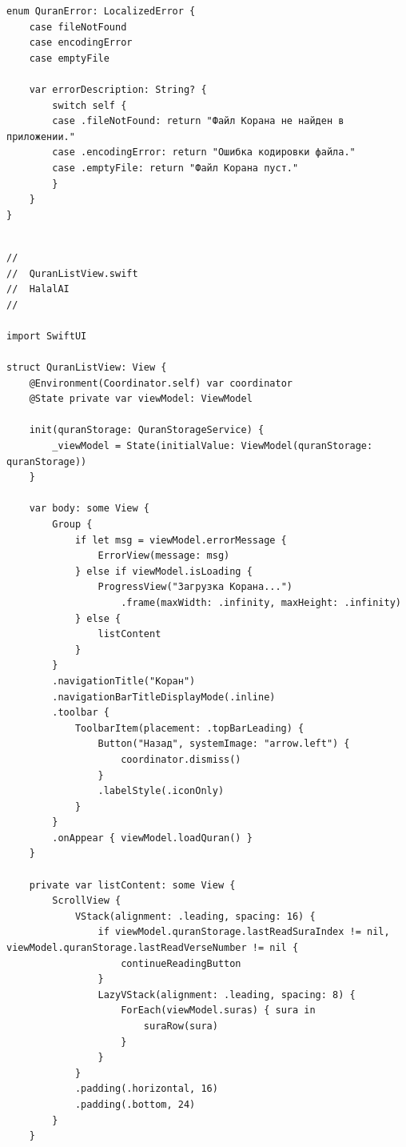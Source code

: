 \begin{lstlisting}[basicstyle=\tiny\ttfamily,breaklines=true]
enum QuranError: LocalizedError {
    case fileNotFound
    case encodingError
    case emptyFile

    var errorDescription: String? {
        switch self {
        case .fileNotFound: return "Файл Корана не найден в приложении."
        case .encodingError: return "Ошибка кодировки файла."
        case .emptyFile: return "Файл Корана пуст."
        }
    }
}
\end{lstlisting}

\begin{lstlisting}[basicstyle=\tiny\ttfamily,breaklines=true]

//
//  QuranListView.swift
//  HalalAI
//

import SwiftUI

struct QuranListView: View {
    @Environment(Coordinator.self) var coordinator
    @State private var viewModel: ViewModel

    init(quranStorage: QuranStorageService) {
        _viewModel = State(initialValue: ViewModel(quranStorage: quranStorage))
    }

    var body: some View {
        Group {
            if let msg = viewModel.errorMessage {
                ErrorView(message: msg)
            } else if viewModel.isLoading {
                ProgressView("Загрузка Корана...")
                    .frame(maxWidth: .infinity, maxHeight: .infinity)
            } else {
                listContent
            }
        }
        .navigationTitle("Коран")
        .navigationBarTitleDisplayMode(.inline)
        .toolbar {
            ToolbarItem(placement: .topBarLeading) {
                Button("Назад", systemImage: "arrow.left") {
                    coordinator.dismiss()
                }
                .labelStyle(.iconOnly)
            }
        }
        .onAppear { viewModel.loadQuran() }
    }

    private var listContent: some View {
        ScrollView {
            VStack(alignment: .leading, spacing: 16) {
                if viewModel.quranStorage.lastReadSuraIndex != nil, viewModel.quranStorage.lastReadVerseNumber != nil {
                    continueReadingButton
                }
                LazyVStack(alignment: .leading, spacing: 8) {
                    ForEach(viewModel.suras) { sura in
                        suraRow(sura)
                    }
                }
            }
            .padding(.horizontal, 16)
            .padding(.bottom, 24)
        }
    }


\end{lstlisting}
